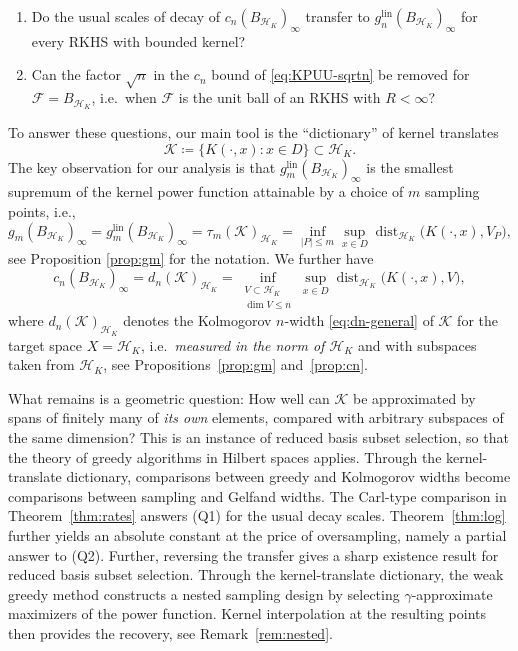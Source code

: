 \documentclass[11pt,reqno, a4paper]{article}
\numberwithin{equation}{section}
\DeclareMathOperator{\dist}{dist}
\newcommand{\lin}{\ensuremath{\mathrm{lin}}}
\begin{document}
\begin{enumerate}
\item[(Q1)] Do the usual scales of decay of $c_n(B_{\mathcal H_K})_\infty$ transfer to $g_n^{\lin}(B_{\mathcal H_K})_\infty$ for every RKHS with bounded kernel?
\item[(Q2)] Can the factor $\sqrt{n}$ in the $c_n$ bound of \eqref{eq:KPUU-sqrtn} be removed for $\mathcal{F}=B_{\mathcal H_K}$, i.e.\ when $\mathcal{F}$ is the unit ball of an RKHS with $R<\infty$?
\end{enumerate}
To answer these questions, our main tool is  the ``dictionary'' of kernel translates
\begin{equation}\label{eq:dictionary}
\mathcal{K}\coloneqq\{K(\cdot,x)\colon x\in D\}\subset \mathcal H_K .
\end{equation}
The key observation for our analysis is that $g_m^{\lin}(B_{\mathcal H_K})_\infty$ is the smallest supremum of the kernel power function attainable by a choice of $m$ sampling points, i.e.,
\begin{equation}
    g_m(B_{\mathcal H_K})_\infty = g_m^{\lin}(B_{\mathcal H_K})_\infty = \tau_m(\mathcal{K})_{\mathcal{H}_K} = \inf_{|P|\le m} \sup_{x\in D}\dist_{\mathcal H_K}\bigl(K(\cdot,x), V_P\bigr),
\end{equation}
see Proposition \ref{prop:gm} for the notation.
We further have 
\begin{equation}\label{eq:cn-dn}
c_n(B_{\mathcal H_K})_\infty = d_n(\mathcal{K})_{\mathcal H_K}
= \inf_{\substack{V\subset\mathcal H_K\\ \dim V \leq n}} \sup_{x\in D} \dist_{\mathcal H_K}\bigl(K(\cdot,x),V\bigr),
\end{equation}
where $d_n(\mathcal{K})_{\mathcal H_K}$ denotes the Kolmogorov $n$-width \eqref{eq:dn-general} of $\mathcal{K}$ for the target space $X=\mathcal H_K$, i.e.\ \emph{measured in the norm of $\mathcal H_K$} and with subspaces taken from $\mathcal H_K$, see Propositions~\ref{prop:gm} and~\ref{prop:cn}.

What remains is a geometric question: How well can $\mathcal{K}$ be approximated by spans of finitely many of
\emph{its own} elements, compared with arbitrary subspaces of the same dimension?
This is an instance of reduced basis subset selection, so that the theory of greedy algorithms in Hilbert spaces \cite{BCDDPW11,DPW13} applies.
Through the kernel-translate dictionary, comparisons between greedy and Kolmogorov widths become comparisons between sampling and Gelfand widths.
The Carl-type comparison in Theorem~\ref{thm:rates} answers (Q1) for the usual decay scales.
Theorem~\ref{thm:log} further yields an absolute constant at the price of oversampling, namely a partial answer to (Q2).
Further, reversing the transfer gives a sharp existence result for reduced basis subset selection.
Through the kernel-translate dictionary, the weak greedy method constructs a nested sampling design by selecting $\gamma$-approximate maximizers of the power function.
Kernel interpolation at the resulting points then provides the recovery, see Remark~\ref{rem:nested}.
 
\end{document}
